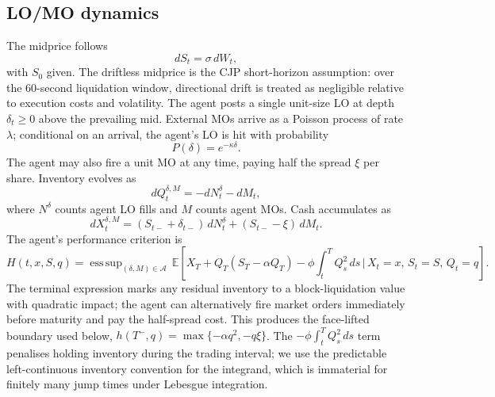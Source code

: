 \documentclass[]{interact}
\theoremstyle{plain}
\theoremstyle{definition}
\theoremstyle{remark}
\newcommand{\E}{\mathbb{E}}
\newcommand{\1}[1]{\mathbf{1}_{\{#1\}}}
\newcommand{\esssup}{\mathop{\mathrm{ess\,sup}}}
\begin{document}
\subsection{LO/MO dynamics}\label{sec:lomo-dynamics}
The midprice follows
\begin{equation}\label{eq:midprice}
dS_t = \sigma\, dW_t,
\end{equation}
with $S_0$ given. The driftless midprice is the CJP short-horizon assumption: over the $60$-second liquidation window, directional drift is treated as negligible relative to execution costs and volatility. The agent posts a single unit-size LO at depth $\delta_t \ge 0$ above the prevailing mid. External MOs arrive as a Poisson process of rate $\lambda$; conditional on an arrival, the agent's LO is hit with probability
\begin{equation}\label{eq:fillprob}
P(\delta) = e^{-\kappa \delta}.
\end{equation}
The agent may also fire a unit MO at any time, paying half the spread $\xi$ per share. Inventory evolves as
\begin{equation}\label{eq:invsde}
dQ^{\delta,M}_t = - dN^{\delta}_t - dM_t,
\end{equation}
where $N^\delta$ counts agent LO fills and $M$ counts agent MOs. Cash accumulates as
\begin{equation}\label{eq:cashsde}
dX^{\delta,M}_t = (S_{t-} + \delta_{t-})\, dN^\delta_t + (S_{t-} - \xi)\, dM_t.
\end{equation}
The agent's performance criterion is
\begin{equation}\label{eq:performance}
H(t,x,S,q) = \esssup_{(\delta, M)\in\mathcal{A}}\, \E\!\left[ X_T + Q_T (S_T - \alpha Q_T)
- \phi \!\int_t^T\! Q_s^2\, ds \,\Big|\, X_t = x,\, S_t = S,\, Q_t = q \right].
\end{equation}
The terminal expression marks any residual inventory to a block-liquidation value with quadratic impact; the agent can alternatively fire market orders immediately before maturity and pay the half-spread cost. This produces the face-lifted boundary used below, $h(T^-,q)=\max\{-\alpha q^2,-q\xi\}$. The $-\phi \int_t^T Q_s^2\, ds$ term penalises holding inventory during the trading interval; we use the predictable left-continuous inventory convention for the integrand, which is immaterial for finitely many jump times under Lebesgue integration.
\end{document}

